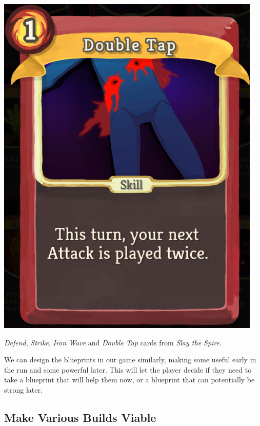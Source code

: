 \begin{center}
\begin{minipage}{.25\textwidth}
    \end{minipage}%
    \begin{minipage}{.25\textwidth}
        \centering
        \includegraphics[width=0.95\textwidth]{img/Slay-the-Spire-Double-Tap.png}
    \end{minipage}
    \caption{\emph{Defend}, \emph{Strike}, \emph{Iron Wave} and \emph{Double Tap} cards from \emph{Slay the Spire.}}
    \label{fig:sts-iron-wave-and-double-tap}
\end{center}

We can design the blueprints in our game similarly, making some useful early in the run and some powerful later.
This will let the player decide if they need to take a blueprint that will help them now, or a blueprint that can potentially be strong later.

\subsection{Make Various Builds Viable} \label{sec:goal-various-builds}

